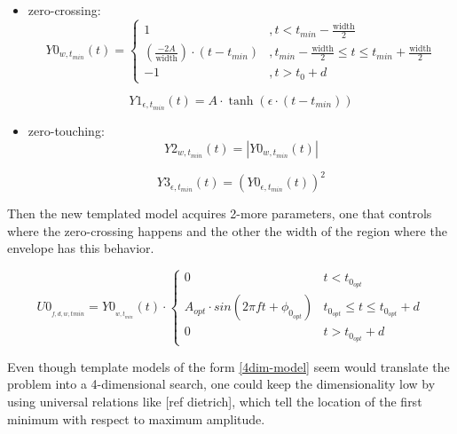 \vspace{1cm}

\begin{itemize}
\item zero-crossing:
\begin{equation}\label{line}
Y0_{w, t_{min}}(t) =
\begin{cases} 
      1 &, t<t_{min}-\mathrm{\frac{width}{2}} \\
      \left( \frac{-2A}{\mathrm{width}} \right) \cdot (t- t_{min}) &, t_{min}-\mathrm{\frac{width}{2}} \leq t \leq t_{min}+\mathrm{\frac{width}{2}} \\
     -1 &, t>t_{0}+d
   \end{cases}
\end{equation}

\begin{equation}\label{tanh}
Y1_{\epsilon, t_{min}}(t) = A \cdot \tanh (\epsilon \cdot(t-t_{min}))
\end{equation}

\vspace{0.5cm}


\item zero-touching:
\begin{equation}\label{line-abs}
Y2_{w, t_{min}}(t) = \left| Y0_{w, t_{min}}(t) \right|
\end{equation}

\begin{equation}\label{tanh2}
Y3_{\epsilon, t_{min}}(t) = \left( Y0_{\epsilon, t_{min}}(t) \right)^2
\end{equation}

\end{itemize}

Then the new templated model acquires 2-more parameters, one that controls where the zero-crossing happens and the other the width of the region where the envelope has this behavior.

\begin{equation}\label{4dim-model}
U0_{_{f,d, w, tmin}} = Y0_{_{w,t_{min}}}(t) \cdot
\begin{cases} 
      0 & t<t_{0_{opt}} \\
      A_{opt} \cdot sin(2\pi f t + \phi_{0_{opt}}) & t_{0_{opt}} \leq t\leq t_{0_{opt}}+d \\
      0 & t>t_{0_{opt}}+d
   \end{cases}
\end{equation}


Even though template models of the form \ref{4dim-model} seem would translate the problem into a 4-dimensional search, one could keep the dimensionality low by using universal relations like [ref dietrich], which tell the location of the first minimum with respect to maximum amplitude. 

